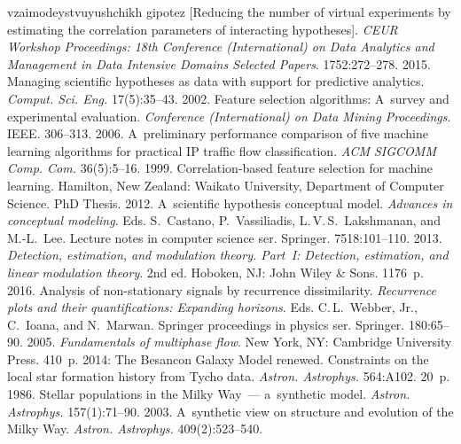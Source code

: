 \begin{multicols}{2}
{{\begin{thebibliography}{99}
\noindent
 vzaimodeystvuyushchikh gipotez [Reducing the number of virtual 
experiments by estimating the correlation parameters of interacting hypotheses]. \textit{CEUR 
Workshop Proceedings:  18th  Conference (International) on Data Analytics 
and Management in Data Intensive Domains Selected Papers}. 1752:272--278.
 2015. Managing scientific hypotheses as data with support for 
predictive analytics. \textit{Comput. Sci. Eng.} 17(5):35--43.
   2002. Feature selection algorithms: A~survey 
and experimental evaluation. \textit{Conference (International) on Data Mining 
Proceedings}.  IEEE. 306--313.
 2006. A~preliminary performance comparison 
of five machine learning algorithms for practical IP traffic flow classification. \textit{ACM 
SIGCOMM Comp. Com.} 36(5):5--16.
 1999. Correlation-based feature selection for machine learning. 
Hamilton, New 
Zealand: Waikato University, Department of Computer Science. PhD Thesis.
 2012. A~scientific 
hypothesis conceptual model. \textit{Advances in conceptual modeling}.
Eds. S.~Castano, P.~Vassiliadis, L.\,V.\,S.~Lakshmanan, and M.-L.~Lee.
 Lecture notes in computer science ser. Springer. 7518:101--110.
 2013. \textit{Detection, estimation, and modulation theory. Part~I: Detection, 
estimation, and linear modulation theory}. 2nd ed. Hoboken, NJ: John Wiley \& Sons. 1176~p.
   2016. Analysis of non-stationary signals by 
recurrence dissimilarity. \textit{Recurrence plots and their quantifications: Expanding horizons}. 
Eds. C.\,L.~Webber, Jr., C.~Ioana, and N.~Marwan.
Springer proceedings in physics ser. Springer. 180:65--90.
   2005. \textit{Fundamentals of multiphase flow}. New York, NY: Cambridge 
University Press. 410~p.
 2014: The Besancon 
Galaxy Model renewed. Constraints on the local star formation history from Tycho data. 
\textit{Astron. Astrophys.} 564:A102. 20~p.
 1986. Stellar populations in the Milky Way~---
a~synthetic model. 
\textit{Astron. Astrophys.} 157(1):71--90.
 2003. A~synthetic view on structure and 
evolution of the Milky Way. \textit{Astron. Astrophys.} 409(2):523--540.     

\end{thebibliography} } }

\end{multicols}

